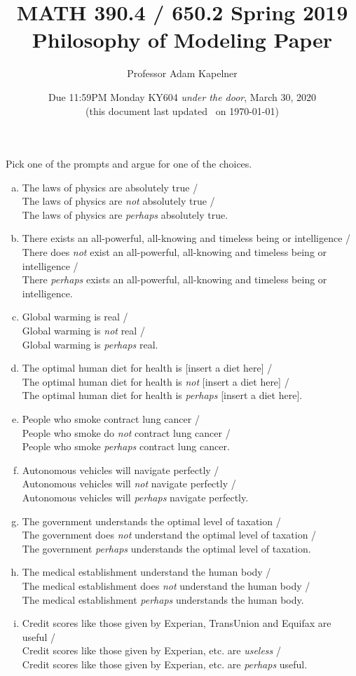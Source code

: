 \documentclass[12pt]{article}
\title{MATH 390.4 / 650.2 Spring 2019 \\ Philosophy of Modeling Paper}
\author{Professor Adam Kapelner} %
\date{Due 11:59PM Monday KY604 \textit{under the door}, March 30, 2020 \\ \vspace{0.5cm} \small (this document last updated \currenttime~on \today)}
\begin{document}
\maketitle

\noindent Pick one of the prompts and argue for one of the choices. 

\begin{enumerate}[(a)]
\item The laws of physics are absolutely true / \\
The laws of physics are \textit{not} absolutely true / \\
The laws of physics are \textit{perhaps} absolutely true.
\item There exists an all-powerful, all-knowing and timeless being or intelligence / \\
There does \textit{not} exist an all-powerful, all-knowing and timeless being or intelligence / \\
There \textit{perhaps} exists an all-powerful, all-knowing and timeless being or intelligence.
\item Global warming is real / \\
Global warming is \textit{not} real / \\
Global warming is \textit{perhaps} real.
\item The optimal human diet for health is [insert a diet here] / \\
The optimal human diet for health is \textit{not} [insert a diet here] / \\
The optimal human diet for health is \textit{perhaps} [insert a diet here].
\item People who smoke contract lung cancer / \\
People who smoke do \textit{not} contract lung cancer / \\
People who smoke \textit{perhaps} contract lung cancer.
\item Autonomous vehicles will navigate perfectly / \\
Autonomous vehicles will \textit{not} navigate perfectly / \\
Autonomous vehicles will \textit{perhaps} navigate perfectly.
\item The government understands the optimal level of taxation / \\
The government does \textit{not} understand the optimal level of taxation / \\
The government \textit{perhaps} understands the optimal level of taxation.
\item The medical establishment understand the human body / \\
The medical establishment does \textit{not} understand the human body / \\
The medical establishment \textit{perhaps} understands the human body.
\item Credit scores like those given by Experian, TransUnion and Equifax are useful / \\
Credit scores like those given by Experian, etc. are \textit{useless} / \\
Credit scores like those given by Experian, etc. are \textit{perhaps} useful.
\end{enumerate}
\end{document}
